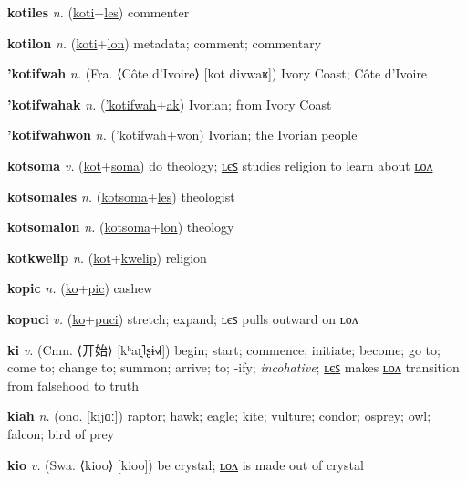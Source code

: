 \textbf{\hypertarget{kotiles}{kotiles}} \textit{n.} (\hyperlink{koti}{koti}+\allowbreak \hyperlink{les}{les})
commenter

\textbf{\hypertarget{kotilon}{kotilon}} \textit{n.} (\hyperlink{koti}{koti}+\allowbreak \hyperlink{lon}{lon})
metadata; comment; commentary

\textbf{\hypertarget{'kotifwah}{'kotifwah}} \textit{n.} (Fra. ⟨Côte d’Ivoire⟩ [kot divwaʁ])
Ivory Coast; Côte d’Ivoire

\textbf{\hypertarget{'kotifwahak}{'kotifwahak}} \textit{n.} (\hyperlink{'kotifwah}{'kotifwah}+\allowbreak \hyperlink{ak}{ak})
Ivorian; from Ivory Coast

\textbf{\hypertarget{'kotifwahwon}{'kotifwahwon}} \textit{n.} (\hyperlink{'kotifwah}{'kotifwah}+\allowbreak \hyperlink{won}{won})
Ivorian; the Ivorian people

\textbf{\hypertarget{kotsoma}{kotsoma}} \textit{v.} (\hyperlink{kot}{kot}+\allowbreak \hyperlink{soma}{soma})
do theology; \hyperlink{kotsomales}{ʟєꜱ} studies religion to learn about \hyperlink{kotsomalon}{ʟᴏᴧ}

\textbf{\hypertarget{kotsomales}{kotsomales}} \textit{n.} (\hyperlink{kotsoma}{kotsoma}+\allowbreak \hyperlink{les}{les})
theologist

\textbf{\hypertarget{kotsomalon}{kotsomalon}} \textit{n.} (\hyperlink{kotsoma}{kotsoma}+\allowbreak \hyperlink{lon}{lon})
theology

\textbf{\hypertarget{kotkwelip}{kotkwelip}} \textit{n.} (\hyperlink{kot}{kot}+\allowbreak \hyperlink{kwelip}{kwelip})
religion

\textbf{\hypertarget{kopic}{kopic}} \textit{n.} (\hyperlink{ko}{ko}+\allowbreak \hyperlink{pic}{pic})
cashew

\textbf{\hypertarget{kopuci}{kopuci}} \textit{v.} (\hyperlink{ko}{ko}+\allowbreak \hyperlink{puci}{puci})
stretch; expand; ʟєꜱ pulls outward on ʟᴏᴧ

\textbf{\hypertarget{ki}{ki}} \textit{v.} (Cmn. ⟨{\chinese{}开始}⟩ [kʰaɪ̯˥ʂɨ˧˩˧])
begin; start; commence; initiate; become; go to; come to; change to; summon; arrive; to; -ify; \textit{incohative}; \hyperlink{kiles}{ʟєꜱ} makes \hyperlink{kilon}{ʟᴏᴧ} transition from falsehood to truth

\textbf{\hypertarget{kiah}{kiah}} \textit{n.} (ono. [kijɑː])
raptor; hawk; eagle; kite; vulture; condor; osprey; owl; falcon; bird of prey

\textbf{\hypertarget{kio}{kio}} \textit{v.} (Swa. ⟨kioo⟩ [kioo])
be crystal; \hyperlink{kiolon}{ʟᴏᴧ} is made out of crystal

